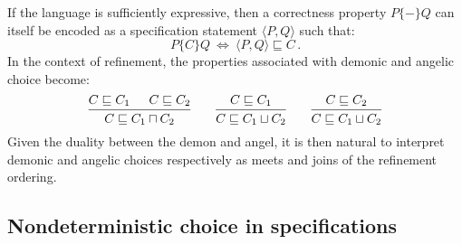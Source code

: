 \documentclass[11pt,oneside,draft]{book}
\theoremstyle{definition}
\newcommand{\htr}[3]{{ {#1} \lbrace {#2} \rbrace {#3} }}
\begin{document}
If the language is sufficiently expressive,
then a correctness property $\htr{P}{-}{Q}$
can itself be encoded \citep{specstm} as
a specification statement $\langle{}P,Q{}\rangle$
such that:
\[
    \htr{P}{C}{Q} \: \Leftrightarrow \:
    \langle{}P,Q{}\rangle \sqsubseteq C \,.
\]
In the context of refinement,
the properties associated with demonic and angelic choice
become:
\[
  \begin{prooftree}
    \hypo{C \sqsubseteq C_1}
    \hypo{C \sqsubseteq C_2}
    \infer2{C \sqsubseteq C_1 \sqcap C_2}
  \end{prooftree}
  \qquad
  \begin{prooftree}
    \hypo{C \sqsubseteq C_1}
    \infer1{C \sqsubseteq C_1 \sqcup C_2}
  \end{prooftree}
  \qquad
  \begin{prooftree}
    \hypo{C \sqsubseteq C_2}
    \infer1{C \sqsubseteq C_1 \sqcup C_2}
  \end{prooftree}
\]
Given the duality between the demon and angel,
it is then natural to interpret demonic and angelic choices
respectively as meets and joins
of the refinement ordering.

\subsection{Nondeterministic choice in specifications}
\end{document}
